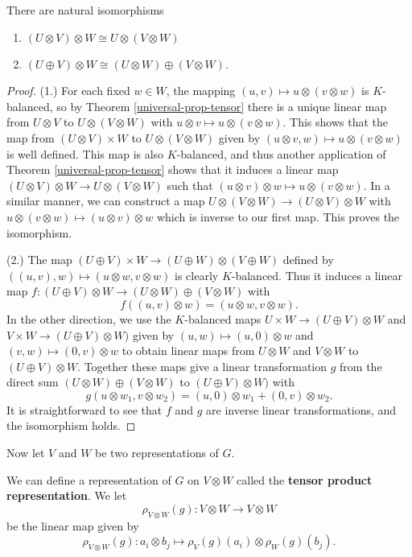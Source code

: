 \begin{prop}
There are natural isomorphisms 
\begin{enumerate}
\item $(U \otimes V) \otimes W \cong U \otimes (V \otimes W)$ 
\item $( U \oplus V) \otimes W \cong (U \otimes W) \oplus (V \otimes W)$.
\end{enumerate}
\end{prop}
\begin{proof}
(1.) For each fixed $w \in W$, the mapping $(u,v) \mapsto u \otimes ( v \otimes w)$ is $K$-balanced, so by Theorem \ref{universal-prop-tensor} there is a unique linear map from $U \otimes V$ to $U \otimes ( V \otimes W)$ with $u \otimes v \mapsto u \otimes (v \otimes w)$.  This shows that the map from $(U \otimes V ) \times W$ to $U \otimes ( V \otimes W)$ given by $(u \otimes v, w ) \mapsto u \otimes (v \otimes w)$ is well defined.  This map is also $K$-balanced, and  thus another application of Theorem \ref{universal-prop-tensor} shows that it induces a linear map $(U \otimes V) \otimes W \to U \otimes ( V \otimes W)$ such that $(u \otimes v) \otimes w \mapsto u \otimes (v \otimes w)$.  In a similar manner, we can construct a map $U \otimes (V \otimes W) \to (U \otimes V) \otimes W$ with $u \otimes ( v \otimes w) \mapsto (u \otimes v) \otimes w$ which is inverse to our first map.  This proves the isomorphism.

(2.)  The map $(U \oplus V ) \times W \to (U \oplus W) \otimes (V \oplus W)$ defined by $((u, v ) , w) \mapsto (u \otimes w, v \otimes w)$ is clearly $K$-balanced.  Thus it induces a linear map $f \colon (U \oplus V) \otimes W \to (U \otimes W) \oplus (V \otimes W)$ with 
\[ f ( ( u, v ) \otimes w) = (u \otimes w, v \otimes w). \]
In the other direction, we use the $K$-balanced maps $U \times W \to (U \oplus V) \otimes W$ and $V \times W \to (U \oplus V) \otimes W)$ given by $(u, w) \mapsto (u, 0)\otimes w$ and $(v,w) \mapsto (0,v) \otimes w$ to obtain linear maps from $U \otimes W$ and $V \otimes W$ to $(U \oplus V) \otimes W$.  Together these maps give a linear transformation $g$ from the direct sum $(U \otimes W) \oplus ( V \otimes W)$ to $(U \oplus V) \otimes W)$ with 
\[ g ( u \otimes w_1, v \otimes w_2) = (u, 0) \otimes w_1 + (0,v) \otimes w_2. \]
It is straightforward to see that $f$ and $g$ are inverse linear transformations, and the isomorphism holds.
\end{proof}


Now let $V$ and $W$ be two representations of $G$.
\begin{defn}
We can define a representation of $G$ on $V \otimes W$ called the \textbf{tensor product representation}. We let
\[ \rho_{V \otimes W} (g) \colon V \otimes W \to V \otimes W \]
be the linear map given by
\[ \rho_{V \otimes W} (g) \colon a_i \otimes b_j \mapsto \rho_V (g) (a_i) \otimes \rho_W (g) (b_j).\]
\end{defn}


